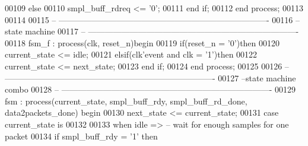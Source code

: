 \begin{DoxyCode}
00109    \textcolor{keywordflow}{else} 
00110       \textcolor{vhdlchar}{smpl_buff_rdreq} \textcolor{vhdlchar}{<=} \textcolor{vhdlchar}{'}\textcolor{vhdllogic}{}\textcolor{vhdllogic}{0}\textcolor{vhdlchar}{'};
00111    \textcolor{keywordflow}{end} \textcolor{keywordflow}{if};
00112 \textcolor{keywordflow}{end} \textcolor{keywordflow}{process};
00113 
00114 
00115 \textcolor{keyword}{-- ----------------------------------------------------------------------------}
00116 \textcolor{keyword}{--state machine}
00117 \textcolor{keyword}{-- ----------------------------------------------------------------------------}
00118 fsm\_f : \textcolor{keywordflow}{process}(clk, reset_n)\textcolor{keywordflow}{begin}
00119     \textcolor{keywordflow}{if}\textcolor{vhdlchar}{(}\textcolor{vhdlchar}{reset_n} \textcolor{vhdlchar}{=} \textcolor{vhdlchar}{'}\textcolor{vhdllogic}{}\textcolor{vhdllogic}{0}\textcolor{vhdlchar}{'}\textcolor{vhdlchar}{)}\textcolor{keywordflow}{then}
00120         \textcolor{vhdlchar}{current_state} \textcolor{vhdlchar}{<=} \textcolor{vhdlchar}{idle};
00121     \textcolor{keywordflow}{elsif}\textcolor{vhdlchar}{(}\textcolor{vhdlchar}{clk}\textcolor{vhdlchar}{'}\textcolor{vhdlkeyword}{event} \textcolor{keywordflow}{and} \textcolor{vhdlchar}{clk} \textcolor{vhdlchar}{=} \textcolor{vhdlchar}{'}\textcolor{vhdllogic}{}\textcolor{vhdllogic}{1}\textcolor{vhdlchar}{'}\textcolor{vhdlchar}{)}\textcolor{keywordflow}{then} 
00122         \textcolor{vhdlchar}{current_state} \textcolor{vhdlchar}{<=} \textcolor{vhdlchar}{next_state};
00123     \textcolor{keywordflow}{end} \textcolor{keywordflow}{if}; 
00124 \textcolor{keywordflow}{end} \textcolor{keywordflow}{process};
00125 
00126 \textcolor{keyword}{-- ----------------------------------------------------------------------------}
00127 \textcolor{keyword}{--state machine combo}
00128 \textcolor{keyword}{-- ----------------------------------------------------------------------------}
00129 fsm : \textcolor{keywordflow}{process}(current_state, smpl_buff_rdy, smpl_buff_rd_done, data2packets_done) \textcolor{keywordflow}{begin}
00130     \textcolor{vhdlchar}{next_state} \textcolor{vhdlchar}{<=} \textcolor{vhdlchar}{current_state};
00131     \textcolor{keywordflow}{case} \textcolor{vhdlchar}{current_state} \textcolor{keywordflow}{is}
00132       
00133         \textcolor{keywordflow}{when} \textcolor{vhdlchar}{idle} \textcolor{vhdlchar}{=}\textcolor{vhdlchar}{>}\textcolor{keyword}{                  -- wait for enough samples for one packet}
00134          \textcolor{keywordflow}{if} \textcolor{vhdlchar}{smpl_buff_rdy} \textcolor{vhdlchar}{=} \textcolor{vhdlchar}{'}\textcolor{vhdllogic}{}\textcolor{vhdllogic}{1}\textcolor{vhdlchar}{'} \textcolor{keywordflow}{then} 

\end{DoxyCode}
